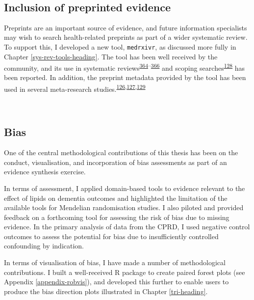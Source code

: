 \documentclass[a4paper, twoside]{templates/ociamthesis}
\begin{document}
~

\hypertarget{inclusion-of-preprinted-evidence}{%
\subsection{Inclusion of preprinted evidence}\label{inclusion-of-preprinted-evidence}}

Preprints are an important source of evidence, and future information specialists may wish to search health-related preprints as part of a wider systematic review. To support this, I developed a new tool, \texttt{medrxivr}, as discussed more fully in Chapter \ref{sys-rev-tools-heading}. The tool has been well received by the community, and its use in systematic reviews\textsuperscript{\protect\hyperlink{ref-imai2021}{364}--\protect\hyperlink{ref-hamilton2021}{366}} and scoping searches\textsuperscript{\protect\hyperlink{ref-grassly2020}{128}} has been reported. In addition, the preprint metadata provided by the tool has been used in several meta-research studies.\textsuperscript{\protect\hyperlink{ref-kodvanj2020}{126},\protect\hyperlink{ref-noone2020}{127},\protect\hyperlink{ref-mcguinness2020DAScomparison}{129}}

~

\hypertarget{bias}{%
\subsection{Bias}\label{bias}}

One of the central methodological contributions of this thesis has been on the conduct, visualisation, and incorporation of bias assessments as part of an evidence synthesis exercise.

In terms of assessment, I applied domain-based tools to evidence relevant to the effect of lipids on dementia outcomes and highlighted the limitation of the available tools for Mendelian randomisation studies. I also piloted and provided feedback on a forthcoming tool for assessing the risk of bias due to missing evidence. In the primary analysis of data from the CPRD, I used negative control outcomes to assess the potential for bias due to insufficiently controlled confounding by indication.

In terms of visualisation of bias, I have made a number of methodological contributions. I built a well-received R package to create paired forest plots (see Appendix \ref{appendix-robvis}), and developed this further to enable users to produce the bias direction plots illustrated in Chapter \ref{tri-heading}.
\end{document}
